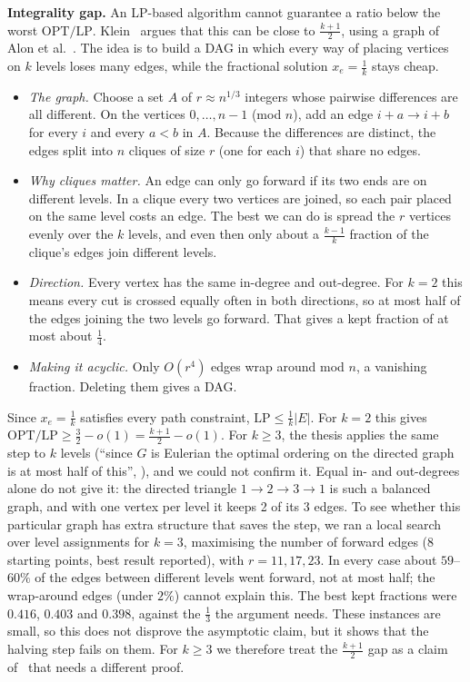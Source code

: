 \documentclass[sigconf,nonacm]{acmart}
\begin{document}
 \textbf{Integrality gap.} An LP-based algorithm cannot guarantee a ratio below the worst $\mathrm{OPT}/\mathrm{LP}$. Klein~\cite{kw} argues that this can be close to $\frac{k+1}2$, using a graph of Alon et al.~\cite{abglsc}. The idea is to build a DAG in which every way of placing vertices on $k$ levels loses many edges, while the fractional solution $x_e=\frac1k$ stays cheap.
\begin{itemize}
\item \emph{The graph.} Choose a set $A$ of $r\approx n^{1/3}$ integers whose pairwise differences are all different. On the vertices $0,\dots,n-1$ (mod $n$), add an edge $i+a\to i+b$ for every $i$ and every $a<b$ in $A$. Because the differences are distinct, the edges split into $n$ cliques of size $r$ (one for each $i$) that share no edges.
\item \emph{Why cliques matter.} An edge can only go forward if its two ends are on different levels. In a clique every two vertices are joined, so each pair placed on the same level costs an edge. The best we can do is spread the $r$ vertices evenly over the $k$ levels, and even then only about a $\frac{k-1}k$ fraction of the clique's edges join different levels.
\item \emph{Direction.} Every vertex has the same in-degree and out-degree. For $k=2$ this means every cut is crossed equally often in both directions, so at most half of the edges joining the two levels go forward. That gives a kept fraction of at most about $\frac14$.
\item \emph{Making it acyclic.} Only $O(r^4)$ edges wrap around mod $n$, a vanishing fraction. Deleting them gives a DAG.
\end{itemize}
 Since $x_e=\frac1k$ satisfies every path constraint, $\mathrm{LP}\le\frac1k|E|$. For $k=2$ this gives $\mathrm{OPT}/\mathrm{LP}\ge\frac32-o(1)=\frac{k+1}2-o(1)$. For $k\ge3$, the thesis applies the same step to $k$ levels (``since $G$ is Eulerian the optimal ordering on the directed graph is at most half of this'', \cite[Sec.~3, p.~5]{kw}), and we could not confirm it. Equal in- and out-degrees alone do not give it: the directed triangle $1\to2\to3\to1$ is such a balanced graph, and with one vertex per level it keeps 2 of its 3 edges. To see whether this particular graph has extra structure that saves the step, we ran a local search over level assignments for $k=3$, maximising the number of forward edges (8 starting points, best result reported), with $r=11,17,23$. In every case about $59$--$60\%$ of the edges between different levels went forward, not at most half; the wrap-around edges (under $2\%$) cannot explain this. The best kept fractions were $0.416$, $0.403$ and $0.398$, against the $\frac13$ the argument needs. These instances are small, so this does not disprove the asymptotic claim, but it shows that the halving step fails on them. For $k\ge3$ we therefore treat the $\frac{k+1}2$ gap as a claim of~\cite{kw} that needs a different proof.
\end{document}
